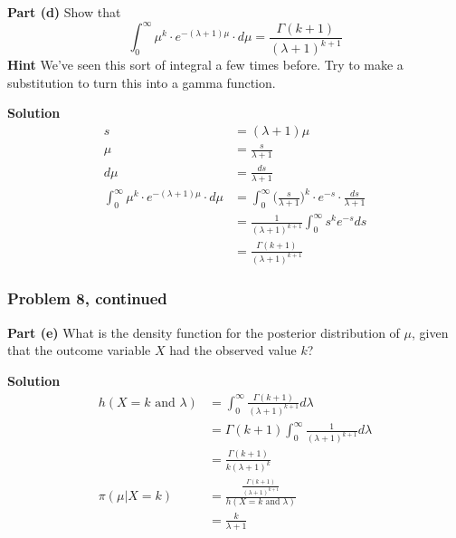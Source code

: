 \documentclass[12pt]{article}
\theoremstyle{definition}
\begin{document}
\noindent
{\bf Part (d)} Show that
$$
\int_0^\infty \mu^{k} \cdot e^{-(\lambda+1) \mu} \cdot d\mu = \frac{ \Gamma( k + 1 ) }{(\lambda + 1)^{k+1} }
$$
\noindent
{\bf Hint} We've seen this sort of integral a few times before. Try to make a substitution to turn this into a gamma function.

\bigskip
\noindent
{\bf Solution}
\begin{align*}
s &= (\lambda + 1)\mu\\
\mu &= \frac{s}{\lambda + 1}\\
d\mu &= \frac{ds}{\lambda + 1}\\
\int_0^\infty \mu^{k} \cdot e^{-(\lambda+1) \mu} \cdot d\mu &= \int_0^\infty \biggr(\frac{s}{\lambda + 1}\biggr)^{k} \cdot e^{-s} \cdot \frac{ds}{\lambda + 1}\\
&= \frac{1}{(\lambda + 1)^{k + 1}} \int_0^\infty s^k e^{-s}ds\\
&= \frac{\Gamma(k + 1)}{(\lambda + 1)^{k + 1}}
\end{align*}



\newpage
\subsubsection*{Problem 8, continued}

\noindent
{\bf Part (e)} What is the density function for the posterior distribution of $\mu$, given that the outcome variable $X$ had the observed value $k$?

\bigskip
\noindent
{\bf Solution}
\begin{align*}
h(X=k \text{ and }\lambda) &= \int_0^\infty \frac{\Gamma(k + 1)}{(\lambda + 1)^{k + 1}} d\lambda\\
&= \Gamma(k + 1) \int_0^\infty \frac{1}{(\lambda + 1)^{k + 1}}d\lambda\\
&= \frac{\Gamma(k + 1)}{k(\lambda + 1)^k}\\
\pi(\mu|X=k) &= \frac{\frac{\Gamma(k + 1)}{(\lambda + 1)^{k + 1}}}{h(X=k \text{ and }\lambda)}\\
&= \frac{k}{\lambda + 1}
\end{align*}
\end{document}
